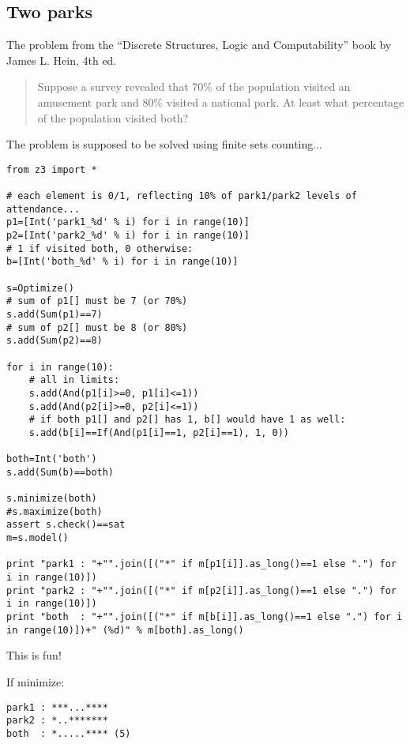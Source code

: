 \subsection{Two parks}

The problem from the ``Discrete Structures, Logic and Computability'' book by James L. Hein, 4th ed.

\begin{framed}
\begin{quotation}

Suppose a survey revealed that 70\% of the population visited
an amusement park and 80\% visited a national park.
At least what percentage of the population visited both?

\end{quotation}
\end{framed}

The problem is supposed to be solved using finite sets counting...

\begin{lstlisting}
from z3 import *

# each element is 0/1, reflecting 10% of park1/park2 levels of attendance...
p1=[Int('park1_%d' % i) for i in range(10)]
p2=[Int('park2_%d' % i) for i in range(10)]
# 1 if visited both, 0 otherwise:
b=[Int('both_%d' % i) for i in range(10)]

s=Optimize()
# sum of p1[] must be 7 (or 70%)
s.add(Sum(p1)==7)
# sum of p2[] must be 8 (or 80%)
s.add(Sum(p2)==8)

for i in range(10):
    # all in limits:
    s.add(And(p1[i]>=0, p1[i]<=1))
    s.add(And(p2[i]>=0, p2[i]<=1))
    # if both p1[] and p2[] has 1, b[] would have 1 as well:
    s.add(b[i]==If(And(p1[i]==1, p2[i]==1), 1, 0))

both=Int('both')
s.add(Sum(b)==both)

s.minimize(both)
#s.maximize(both)
assert s.check()==sat
m=s.model()

print "park1 : "+"".join([("*" if m[p1[i]].as_long()==1 else ".") for i in range(10)])
print "park2 : "+"".join([("*" if m[p2[i]].as_long()==1 else ".") for i in range(10)])
print "both  : "+"".join([("*" if m[b[i]].as_long()==1 else ".") for i in range(10)])+" (%d)" % m[both].as_long()
\end{lstlisting}

This is fun!

If minimize:

\begin{lstlisting}
park1 : ***...****
park2 : *..*******
both  : *.....**** (5)
\end{lstlisting}

